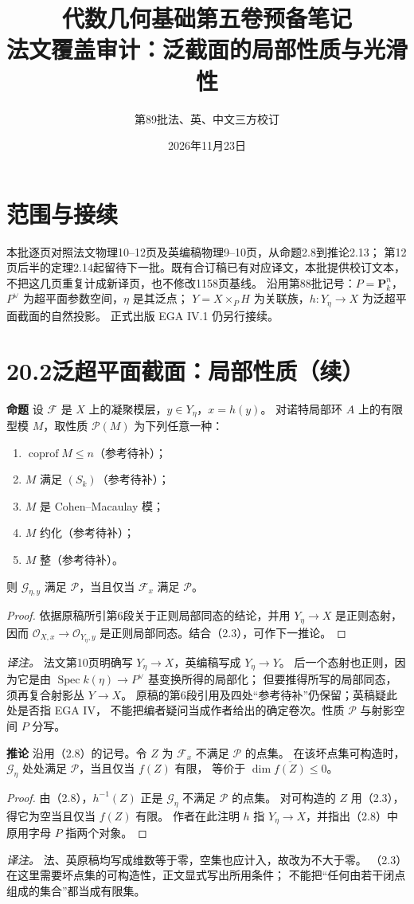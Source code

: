 \documentclass[openany,fontset=fandol]{ctexbook}
\newcommand{\OO}{\mathcal O}
\newcommand{\FF}{\mathcal F}
\newcommand{\GG}{\mathcal G}
\newcommand{\PP}{\mathbf P}
\DeclareMathOperator{\Spec}{Spec}
\DeclareMathOperator{\coprof}{coprof}
\newcommand{\tagitem}[2]{\par\medskip\noindent\textbf{#1\quad #2}\enspace}
\begin{document}
\title{代数几何基础第五卷预备笔记\\法文覆盖审计：泛截面的局部性质与光滑性}
\author{第89批\quad 法、英、中文三方校订}
\date{2026年11月23日}
\maketitle

\section*{范围与接续}
本批逐页对照法文物理10--12页及英编稿物理9--10页，从命题2.8到推论2.13；
第12页后半的定理2.14起留待下一批。既有合订稿已有对应译文，本批提供校订文本，
不把这几页重复计成新译页，也不修改1158页基线。
沿用第88批记号：$P=\PP^n_k$，$P^\vee$ 为超平面参数空间，$\eta$ 是其泛点；
$Y=X\times_P H$ 为关联族，$h:Y_\eta\to X$ 为泛超平面截面的自然投影。
正式出版 EGA IV.1 仍另行接续。

\section*{20.2\quad 泛超平面截面：局部性质（续）}
\tagitem{命题}{2.8}
设 $\FF$ 是 $X$ 上的凝聚模层，$y\in Y_\eta$，$x=h(y)$。
对诺特局部环 $A$ 上的有限型模 $M$，取性质 $\mathcal P(M)$ 为下列任意一种：
\begin{enumerate}
 \item[(i)] $\coprof M\le n$（参考待补）；
 \item[(ii)] $M$ 满足 $(S_k)$（参考待补）；
 \item[(iii)] $M$ 是 Cohen--Macaulay 模；
 \item[(iv)] $M$ 约化（参考待补）；
 \item[(v)] $M$ 整（参考待补）。
\end{enumerate}
则 $\GG_{\eta,y}$ 满足 $\mathcal P$，当且仅当 $\FF_x$ 满足 $\mathcal P$。
\begin{proof}
依据原稿所引第6段关于正则局部同态的结论，并用 $Y_\eta\to X$ 是正则态射，
因而 $\OO_{X,x}\to\OO_{Y_\eta,y}$ 是正则局部同态。结合（2.3），可作下一推论。
\end{proof}
\noindent\emph{译注。} 法文第10页明确写 $Y_\eta\to X$，英编稿写成 $Y_\eta\to Y$。
后一个态射也正则，因为它是由 $\Spec k(\eta)\to P^\vee$ 基变换所得的局部化；
但要推得所写的局部同态，须再复合射影丛 $Y\to X$。
原稿的第6段引用及四处“参考待补”仍保留；英稿疑此处是否指 EGA IV，
不能把编者疑问当成作者给出的确定卷次。性质 $\mathcal P$ 与射影空间 $P$ 分写。

\tagitem{推论}{2.9}
沿用（2.8）的记号。令 $Z$ 为 $\FF_x$ 不满足 $\mathcal P$ 的点集。
在该坏点集可构造时，$\GG_\eta$ 处处满足 $\mathcal P$，当且仅当 $f(Z)$ 有限，
等价于 $\dim\overline{f(Z)}\le 0$。
\begin{proof}
由（2.8），$h^{-1}(Z)$ 正是 $\GG_\eta$ 不满足 $\mathcal P$ 的点集。
对可构造的 $Z$ 用（2.3），得它为空当且仅当 $f(Z)$ 有限。
作者在此注明 $h$ 指 $Y_\eta\to X$，并指出（2.8）中原用字母 $P$ 指两个对象。
\end{proof}
\noindent\emph{译注。} 法、英原稿均写成维数等于零，空集也应计入，故改为不大于零。
（2.3）在这里需要坏点集的可构造性，正文显式写出所用条件；
不能把“任何由若干闭点组成的集合”都当成有限集。
\end{document}
